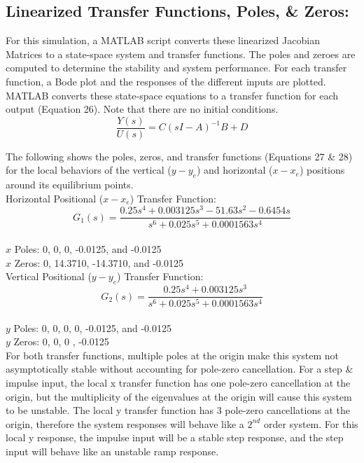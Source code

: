 \documentclass[conference]{IEEEtran}
\begin{document}
\newpage
\subsection{Linearized Transfer Functions, Poles, \& Zeros:}
For this simulation, a MATLAB script converts these linearized Jacobian Matrices to a state-space system and transfer functions. The poles and zeroes are computed to determine the stability and system performance. For each transfer function, a Bode plot and the responses of the different inputs are plotted. \\

MATLAB converts these state-space equations to a transfer function for each output (Equation 26). Note that there are no initial conditions.
\[
 \frac{Y(s)}{U(s)} = C(sI-A)^{-1}B+D \tag{26}
\]

The following shows the poles, zeros, and transfer functions (Equations 27 \& 28) for the local behaviors of the vertical ($y - y_e$) and horizontal ($x - x_e$) positions around its equilibrium points.\\

Horizontal Positional ($x - x_e$) Transfer Function:\\
\[
G_1(s) = \frac{0.25 s^4 + 0.003125 s^3 - 51.63 s^2 - 0.6454 s}{s^6 + 0.025 s^5 + 0.0001563 s^4} \tag{27}
\]
\\
\noindent $x$ Poles: 0, 0, 0, -0.0125, and -0.0125\\
$x$ Zeros: 0, 14.3710, -14.3710, and -0.0125\\

Vertical Positional ($y - y_e$) Transfer Function:
\[
G_2(s) = \frac{0.25 s^4 + 0.003125 s^3}{s^6 + 0.025 s^5 + 0.0001563 s^4} \tag{28}
\]
\\
$y$ Poles: 0, 0, 0, 0, -0.0125, and -0.0125\\
$y$ Zeros: 0, 0, 0 , -0.0125\\

For both transfer functions, multiple poles at the origin make this system not asymptotically stable without accounting for pole-zero cancellation. For a step \& impulse input, the local x transfer function has one pole-zero cancellation at the origin, but the multiplicity of the eigenvalues at the origin will cause this system to be unstable. The local y transfer function has 3 pole-zero cancellations at the origin, therefore the system responses will behave like a $2^{nd}$ order system. For this local y response, the impulse input will be a stable step response, and the step input will behave like an unstable ramp response. 
\end{document}
